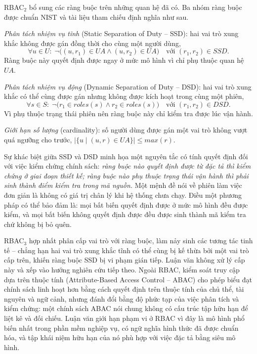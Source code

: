 RBAC$_2$ bổ sung các ràng buộc trên những quan hệ đã có. Ba nhóm ràng buộc được chuẩn NIST \cite{ferraiolo2001} và tài liệu tham chiếu \cite{sandhu1996} định nghĩa như sau.

\emph{Phân tách nhiệm vụ tĩnh} (Static Separation of Duty -- SSD): hai vai trò xung khắc không được gán đồng thời cho cùng một người dùng,
\[ \forall u \in U:\; \neg\big( (u, r_1) \in UA \wedge (u, r_2) \in UA \big) \quad \text{với } (r_1, r_2) \in \mathit{SSD}. \]
Ràng buộc này quyết định được ngay ở mức mô hình vì chỉ phụ thuộc quan hệ $UA$.

\emph{Phân tách nhiệm vụ động} (Dynamic Separation of Duty -- DSD): hai vai trò xung khắc có thể cùng được gán nhưng không được kích hoạt trong cùng một phiên,
\[ \forall s \in S:\; \neg\big( r_1 \in \mathit{roles}(s) \wedge r_2 \in \mathit{roles}(s) \big) \quad \text{với } (r_1, r_2) \in \mathit{DSD}. \]
Vì phụ thuộc trạng thái phiên nên ràng buộc này chỉ kiểm tra được lúc vận hành.

\emph{Giới hạn số lượng} (cardinality): số người dùng được gán một vai trò không vượt quá ngưỡng cho trước, $|\{u \mid (u,r) \in UA\}| \le \mathit{max}(r)$.

\begin{nhanxet}
\label{nx:hai-thoi-diem}
Sự khác biệt giữa SSD và DSD minh họa một nguyên tắc có tính quyết định đối với việc kiểm chứng chính sách: \emph{ràng buộc nào quyết định được từ đặc tả thì kiểm chứng ở giai đoạn thiết kế; ràng buộc nào phụ thuộc trạng thái vận hành thì phải sinh thành điểm kiểm tra trong mã nguồn.} Một mệnh đề nói về phiên làm việc đơn giản là không có giá trị chân lý khi hệ thống chưa chạy. Điều một phương pháp có thể bảo đảm là: mọi bất biến quyết định được ở mức mô hình đều được kiểm, và mọi bất biến không quyết định được đều được sinh thành mã kiểm tra chứ không bị bỏ quên.
\end{nhanxet}

RBAC$_3$ hợp nhất phân cấp vai trò với ràng buộc, làm nảy sinh các tương tác tinh tế -- chẳng hạn hai vai trò xung khắc tĩnh có thể cùng bị kế thừa bởi một vai trò cấp trên, khiến ràng buộc SSD bị vi phạm gián tiếp. Luận văn không xử lý cấp này và xếp vào hướng nghiên cứu tiếp theo. Ngoài RBAC, kiểm soát truy cập dựa trên thuộc tính (Attribute-Based Access Control -- ABAC) \cite{hu2014abac} cho phép biểu đạt chính sách linh hoạt hơn bằng cách quyết định trên thuộc tính của chủ thể, tài nguyên và ngữ cảnh, nhưng đánh đổi bằng độ phức tạp của việc phân tích và kiểm chứng: một chính sách ABAC nói chung không có cấu trúc tập hữu hạn để liệt kê và đối chiếu. Luận văn giới hạn phạm vi ở RBAC vì đây là mô hình phổ biến nhất trong phần mềm nghiệp vụ, có ngữ nghĩa hình thức đã được chuẩn hóa, và tập khái niệm hữu hạn của nó phù hợp với việc đặc tả bằng siêu mô hình.

